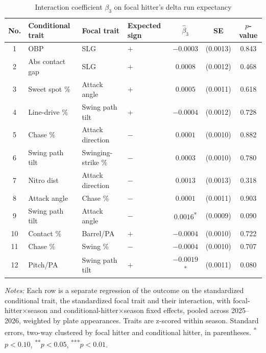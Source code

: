 \begin{table}[htbp]
\centering
\small
\caption{Interaction coefficient $\beta_3$ on focal hitter's delta run expectancy}
\label{tab:table1_focal_pooled}
\begin{tabular}{clllccc}
\toprule
No. & Conditional trait & Focal trait & Expected sign & $\hat\beta_3$ & SE & $p$-value \\
\midrule
1 & OBP & SLG & $+$ & $-0.0003$ & (0.0013) & 0.843 \\
2 & Abs contact gap & SLG & $+$ & $0.0008$ & (0.0012) & 0.468 \\
3 & Sweet spot \% & Attack angle & $+$ & $0.0005$ & (0.0011) & 0.618 \\
4 & Line-drive \% & Swing path tilt & $+$ & $-0.0004$ & (0.0012) & 0.728 \\
5 & Chase \% & Attack direction & $-$ & $0.0001$ & (0.0010) & 0.882 \\
6 & Swing path tilt & Swinging-strike \% & $-$ & $0.0003$ & (0.0010) & 0.780 \\
7 & Nitro dist & Attack direction & $-$ & $0.0013$ & (0.0013) & 0.318 \\
8 & Attack angle & Chase \% & $-$ & $0.0001$ & (0.0011) & 0.903 \\
9 & Swing path tilt & Attack angle & $-$ & $0.0016$\textsuperscript{*} & (0.0009) & 0.090 \\
10 & Contact \% & Barrel/PA & $+$ & $-0.0004$ & (0.0010) & 0.722 \\
11 & Chase \% & Swing \% & $-$ & $-0.0004$ & (0.0010) & 0.707 \\
12 & Pitch/PA & Swing path tilt & $+$ & $-0.0019$\textsuperscript{*} & (0.0011) & 0.080 \\
\bottomrule
\end{tabular}
\par\smallskip\parbox{0.95\textwidth}{\footnotesize \textit{Notes:} Each row is a separate regression of the outcome on the standardized conditional trait, the standardized focal trait and their interaction, with focal-hitter$\times$season and conditional-hitter$\times$season fixed effects, pooled across 2025--2026, weighted by plate appearances. Traits are z-scored within season. Standard errors, two-way clustered by focal hitter and conditional hitter, in parentheses. \textsuperscript{*}$p<0.10$, \textsuperscript{**}$p<0.05$, \textsuperscript{***}$p<0.01$.}
\end{table}
